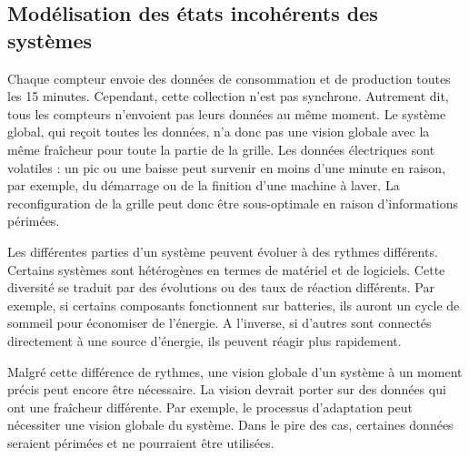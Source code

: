 \subsection{Modélisation des états incohérents des systèmes}
%
Chaque compteur envoie des données de consommation et de production toutes les 15 minutes. 
Cependant, cette collection n'est pas synchrone. 
Autrement dit, tous les compteurs n'envoient pas leurs données au même moment. 
Le système global, qui reçoit toutes les données, n'a donc pas une vision globale avec la même fraîcheur pour toute la partie de la grille. 
Les données électriques sont volatiles : un pic ou une baisse peut survenir en moins d'une minute en raison, par exemple, du démarrage ou de la finition d'une machine à laver. 
La reconfiguration de la grille peut donc être sous-optimale en raison d'informations périmées.

%
Les différentes parties d'un système peuvent évoluer à des rythmes différents. 
Certains systèmes sont hétérogènes en termes de matériel et de logiciels. 
Cette diversité se traduit par des évolutions ou des taux de réaction différents. 
Par exemple, si certains composants fonctionnent sur batteries, ils auront un cycle de sommeil pour économiser de l'énergie. 
A l'inverse, si d'autres sont connectés directement à une source d'énergie, ils peuvent réagir plus rapidement.

%
Malgré cette différence de rythmes, une vision globale d'un système à un moment précis peut encore être nécessaire. 
La vision devrait porter sur des données qui ont une fraîcheur différente. 
Par exemple, le processus d'adaptation peut nécessiter une vision globale du système. 
Dans le pire des cas, certaines données seraient périmées et ne pourraient être utilisées.


